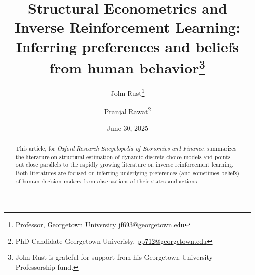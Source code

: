 \documentclass[11pt]{article}
\title{ \vspace*{1cm} \hspace*{-0.5cm}Structural Econometrics and Inverse Reinforcement Learning:\\
Inferring preferences and beliefs from human behavior\footnote{John Rust is grateful for support
from his Georgetown University Professorship fund.
}}
\author{John Rust\thanks{Professor, Georgetown University
\href{mailto:jf693@georgetown.edu}{jf693@georgetown.edu}} \and Pranjal Rawat\thanks{PhD Candidate Georgetown Univeristy.  \href{mailto:pp712@georgetown.edu}{pp712@georgetown.edu}}}
\date{ \vspace*{0.5cm} June 30, 2025 \\ \bigskip {\Large PRELIMINARY DRAFT: NOT FOR CIRCULATION} }
\begin{document}
\bgroup
\let\footnoterule\relax

\begin{singlespace}
\maketitle


\begin{abstract}
This article, for  {\it Oxford Research Encyclopedia of Economics and Finance,\/}
summarizes the literature on structural estimation of dynamic discrete choice models and points 
out close parallels to the  rapidly growing literature on inverse reinforcement learning. 
Both literatures are focused on inferring underlying preferences (and sometimes beliefs)
of human decision makers from observations of their states and actions.
\end{abstract}
\end{singlespace}
\thispagestyle{empty}

\clearpage
\egroup
\setcounter{page}{1}















\clearpage
\begin{singlespace}
%
%


\end{singlespace}


\newpage
\appendix
\setcounter{table}{0}
\renewcommand{\tablename}{Appendix Table}
\renewcommand{\figurename}{Appendix Figure}
\renewcommand{\thetable}{A\arabic{table}}
\setcounter{figure}{0}
\renewcommand{\thefigure}{A\arabic{figure}}
\end{document}
